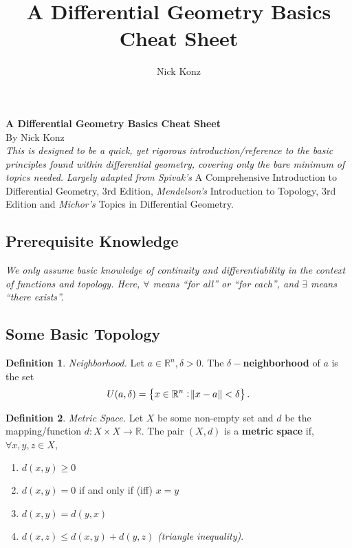 \documentclass[10pt,landscape]{article}
\title{A Differential Geometry Basics Cheat Sheet}
\author{Nick Konz}
\theoremstyle{definition}
\newtheorem{definition}{Definition}[section]
\theoremstyle{remark}
\newcommand{\R}{\mathbb{R}}
\newcommand{\Rn}{\mathbb{R}^n}
\begin{document}
\begin{center}
     \Large{\textbf{A Differential Geometry Basics Cheat Sheet}} \\
     \small{By Nick Konz}\\
     \textit{This is designed to be a quick, yet rigorous introduction/reference to the basic principles found within differential geometry, covering only the bare minimum of topics needed.}
     \small{\textit{Largely adapted from Spivak's} {A Comprehensive Introduction to Differential Geometry, 3rd Edition}, \textit{Mendelson's} Introduction to Topology, 3rd Edition and \textit{Michor's} Topics in Differential Geometry.}
\end{center}
\begin{multicols*}{3}

\section{Prerequisite Knowledge}
\textit{We only assume basic knowledge of continuity and differentiability in the context of functions and topology. Here, $\forall$ means ``for all'' or ``for each'', and $\exists$ means ``there exists''.}
\subsection{Some Basic Topology}

\theoremstyle{definition}
\begin{definition}{\textit{Neighborhood.}}
Let $a\in\Rn, \delta > 0$. The $\delta-$\textbf{neighborhood} of $a$ is the set
\begin{equation}
    U(a,\delta)=\left\{x\in\Rn:\norm{x-a}<\delta\right\}.
\end{equation}
\end{definition}

\theoremstyle{definition}
\begin{definition}{\textit{Metric Space.}}
Let $X$ be some non-empty set and $d$ be the mapping/function $d:X\times X\rightarrow \R$. The pair $(X,d)$ is a \textbf{metric space} if, $\forall x,y,z\in X$,
\begin{enumerate}
    \item $d(x,y) \geq 0$
    \item $d(x,y) = 0$ if and only if (iff) $x = y$
    \item $d(x,y)=d(y,x)$
    \item $d(x,z)\leq d(x,y) + d(y,z)$ \textit{(triangle inequality)}.
\end{enumerate}
\end{definition}


\end{multicols*}
\end{document}
